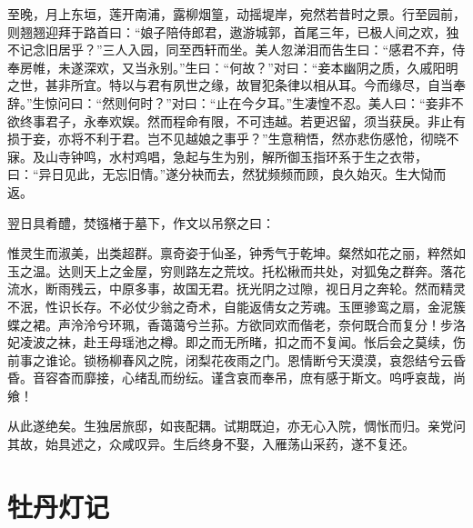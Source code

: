\documentclass[a4paper,12pt,UTF8,twoside]{ctexbook}
\begin{document}
至晚，月上东垣，莲开南浦，露柳烟篁，动摇堤岸，宛然若昔时之景。行至园前，则翘翘迎拜于路首曰：“娘子陪侍郎君，遨游城郭，首尾三年，已极人间之欢，独不记念旧居乎？”三人入园，同至西轩而坐。美人忽涕泪而告生曰：“感君不弃，侍奉房帷，未遂深欢，又当永别。”生曰：“何故？”对曰：“妾本幽阴之质，久戚阳明之世，甚非所宜。特以与君有夙世之缘，故冒犯条律以相从耳。今而缘尽，自当奉辞。”生惊问曰：“然则何时？”对曰：“止在今夕耳。”生凄惶不忍。美人曰：“妾非不欲终事君子，永奉欢娱。然而程命有限，不可违越。若更迟留，须当获戾。非止有损于妾，亦将不利于君。岂不见越娘之事乎？”生意稍悟，然亦悲伤感怆，彻晓不寐。及山寺钟鸣，水村鸡唱，急起与生为别，解所御玉指环系于生之衣带，曰：“异日见此，无忘旧情。”遂分袂而去，然犹频频而顾，良久始灭。生大恸而返。

翌日具肴醴，焚镪楮于墓下，作文以吊祭之曰：

惟灵生而淑美，出类超群。禀奇姿于仙圣，钟秀气于乾坤。粲然如花之丽，粹然如玉之温。达则天上之金屋，穷则路左之荒坟。托松楸而共处，对狐兔之群奔。落花流水，断雨残云，中原多事，故国无君。抚光阴之过隙，视日月之奔轮。然而精灵不泯，性识长存。不必仗少翁之奇术，自能返倩女之芳魂。玉匣骖鸾之扇，金泥簇蝶之裙。声泠泠兮环珮，香蔼蔼兮兰荪。方欲同欢而偕老，奈何既合而复分！步洛妃凌波之袜，赴王母瑶池之樽。即之而无所睹，扣之而不复闻。怅后会之莫续，伤前事之谁论。锁杨柳春风之院，闭梨花夜雨之门。恩情断兮天漠漠，哀怨结兮云昏昏。音容杳而靡接，心绪乱而纷纭。谨含哀而奉吊，庶有感于斯文。呜呼哀哉，尚飨！

从此遂绝矣。生独居旅邸，如丧配耦。试期既迫，亦无心入院，惆怅而归。亲党问其故，始具述之，众咸叹异。生后终身不娶，入雁荡山采药，遂不复还。

\chapter{牡丹灯记}
\end{document}
